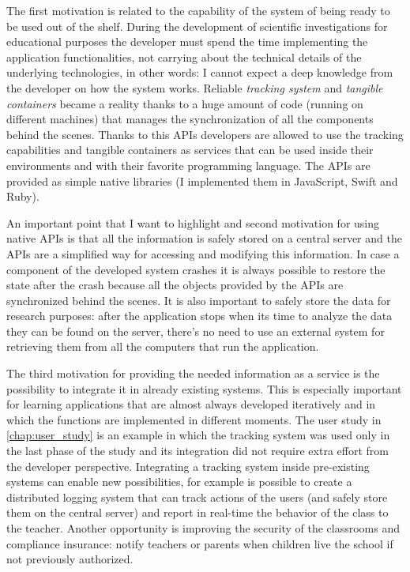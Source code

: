 The first motivation is related to the capability of the system of being ready to be used out of the shelf. During the development of scientific investigations for educational purposes the developer must spend the time implementing the application functionalities, not carrying about the technical details of the underlying technologies, in other words: I cannot expect a deep knowledge from the developer on how the system works. Reliable \textit{tracking system} and \textit{tangible containers} became a reality thanks to a huge amount of code (running on different machines) that manages the synchronization of all the components behind the scenes. Thanks to this APIs developers are allowed to use the tracking capabilities and tangible containers as services that can be used inside their environments and with their favorite programming language. The APIs are provided as simple native libraries (I implemented them in JavaScript, Swift and Ruby). 

An important point that I want to highlight and second motivation for using native APIs is that all the information is safely stored on a central server and the APIs are a simplified way for accessing and modifying this information. In case a component of the developed system crashes it is always possible to restore the state after the crash because all the objects provided by the APIs are synchronized behind the scenes. It is also important to safely store the data for research purposes: after the application stops when its time to analyze the data they can be found on the server, there's no need to use an external system for retrieving them from all the computers that run the application.

The third motivation for providing the needed information as a service is the possibility to integrate it in already existing systems. This is especially important for learning applications that are almost always developed iteratively and in which the functions are implemented in different moments. The user study in \autoref{chap:user_study} is an example in which the tracking system was used only in the last phase of the study and its integration did not require extra effort from the developer perspective. Integrating a tracking system inside pre-existing systems can enable new possibilities, for example is possible to create a distributed logging system that can track actions of the users (and safely store them on the central server) and report in real-time the behavior of the class to the teacher. Another opportunity is improving the security of the classrooms and compliance insurance: notify teachers or parents when children live the school if not previously authorized.
